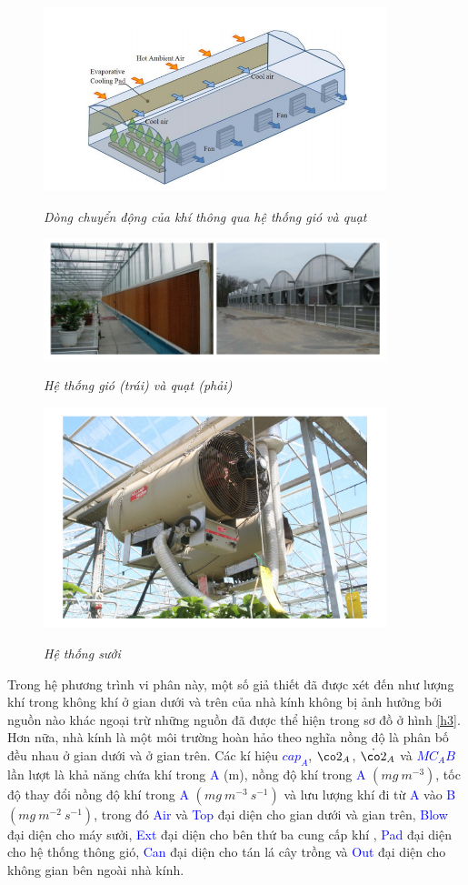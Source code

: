 \documentclass[13pt,a4paper]{article}
\begin{document}
			\begin{figure}[h!]
				\begin{center}
					\includegraphics[width=10cm]{co2_line.png}
					\caption{\textit{Dòng chuyển động của khí  thông qua hệ thống gió và quạt}}
					\label{h4}
					\includegraphics[width=10cm]{vent.png}
					\caption{\textit{Hệ thống gió (trái) và quạt (phải)}}
					\label{h5}
					\includegraphics[width=10cm]{heal.png}
					\caption{\textit{Hệ thống sưởi}}
					\label{h6}
				\end{center}
			\end{figure}
			Trong hệ phương trình vi phân này, một số giả thiết đã được xét đến như lượng khí  trong không khí ở gian dưới và trên của nhà kính không bị ảnh hưởng bởi nguồn nào khác ngoại trừ những nguồn đã được thể hiện trong sơ đồ ở hình \ref{h3}. Hơn nữa, nhà kính là một môi trường hoàn hảo theo nghĩa nồng độ  là phân bố đều nhau ở gian dưới và ở gian trên. Các kí hiệu \textit{\textcolor{blue}{$cap_A$}}, \textcolor{blue}{$\co2_A$}, \textcolor{blue}{$\dot{\co2}_A$} và \textit{\textcolor{blue}{$MC_AB$}} lần lượt là khả năng chứa khí  trong \textcolor{blue}{A} (m), nồng độ khí  trong \textcolor{blue}{A} $(mg\ m^{-3})$, tốc độ thay đổi nồng độ khí  trong \textcolor{blue}{A} $(mg\ m^{-3}\ s^{-1})$ và lưu lượng khí  đi từ \textcolor{blue}{A} vào \textcolor{blue}{B} $(mg\ m^{-2}\ s^{-1})$, trong đó \textcolor{blue}{Air} và \textcolor{blue}{Top} đại diện cho gian dưới và gian trên, \textcolor{blue}{Blow} đại diện cho máy sưởi, \textcolor{blue}{Ext} đại diện cho bên thứ ba cung cấp khí , \textcolor{blue}{Pad} đại diện cho hệ thống thông gió, \textcolor{blue}{Can} đại diện cho tán lá cây trồng và \textcolor{blue}{Out} đại diện cho không gian bên ngoài nhà kính. \\
\end{document}
